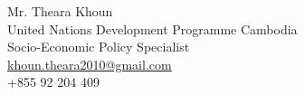 \documentclass[10pt,a4paper]{article}
\begin{document}
\parbox{0.5\textwidth}{ %
	Mr. Theara Khoun \\ 
	United Nations Development Programme Cambodia\\ 
	Socio-Economic Policy Specialist\\
	\href{mailto: khoun.theara2010@gmail.com}{khoun.theara2010@gmail.com}\\
	+855 92 204 409
}
\hfill %
\parbox{0.5\textwidth}{ %
}

\end{document}
